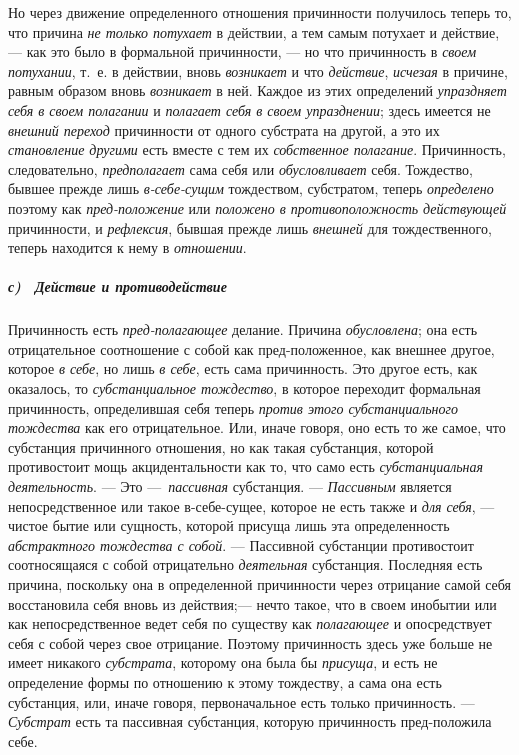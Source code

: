Но через движение определенного отношения причинности получилось теперь то,
что причина {\em не только потухает} в действии, а тем
самым потухает и действие, — как это было в формальной причинности, — но
что причинность в {\em своем потухании}, т.~е. в
действии, вновь {\em возникает} и что
{\em действие}, {\em исчезая} в
причине, равным образом вновь {\em возникает} в ней.
Каждое из этих определений {\em упраздняет себя в своем
полагании} и {\em полагает себя в своем упразднении};
здесь имеется не {\em внешний переход} причинности от
одного субстрата на другой, а это их {\em становление
другими} есть вместе с тем их {\em собственное
полагание}. Причинность, следовательно,
{\em предполагает} сама себя или
{\em обусловливает} себя. Тождество, бывшее прежде лишь
{\em в-себе-сущим} тождеством, субстратом, теперь
{\em определено} поэтому как
{\em пред-положение} или
{\em положено в противоположность действующей}
причинности, и {\em рефлексия}, бывшая прежде лишь
{\em внешней} для тождественного, теперь находится к
нему в {\em отношении}.

\subparagraph[с) \ Действие и противодействие]{с) \ Действие и
противодействие}
Причинность есть
{\em пред-полагающее} делание. Причина
{\em обусловлена}; она есть отрицательное соотношение с
собой как пред-положенное, как внешнее другое, которое
{\em в себе}, но лишь {\em в себе},
есть сама причинность. Это другое есть, как оказалось, то
{\em субстанциальное тождество}, в которое переходит
формальная причинность, определившая себя теперь
{\em против этого субстанциального тождества} как его
отрицательное. Или, иначе говоря, оно есть то же самое, что субстанция
причинного отношения, но как такая субстанция, которой противостоит мощь
акцидентальности как то, что само есть
{\em субстанциальная деятельность}. — Это
—~{\em пассивная} субстанция. —
{\em Пассивным} является непосредственное или такое
в-себе-сущее, которое не есть также и {\em для себя}, —
чистое бытие или сущность, которой присуща лишь эта определенность
{\em абстрактного тождества с собой}. — Пассивной
субстанции противостоит соотносящаяся с собой отрицательно
{\em деятельная} субстанция. Последняя есть причина,
поскольку она в определенной причинности через отрицание самой себя
восстановила себя вновь из действия;— нечто такое, что в своем инобытии или
как непосредственное ведет себя по существу как
{\em полагающее} и опосредствует себя с собой через
свое отрицание. Поэтому причинность здесь уже больше не имеет никакого
{\em субстрата}, которому она была бы
{\em присуща}, и есть не определение формы по отношению
к этому тождеству, а сама она есть субстанция, или, иначе говоря,
первоначальное есть только причинность. —
{\em Субстрат} есть та пассивная субстанция, которую
причинность пред-положила себе.

